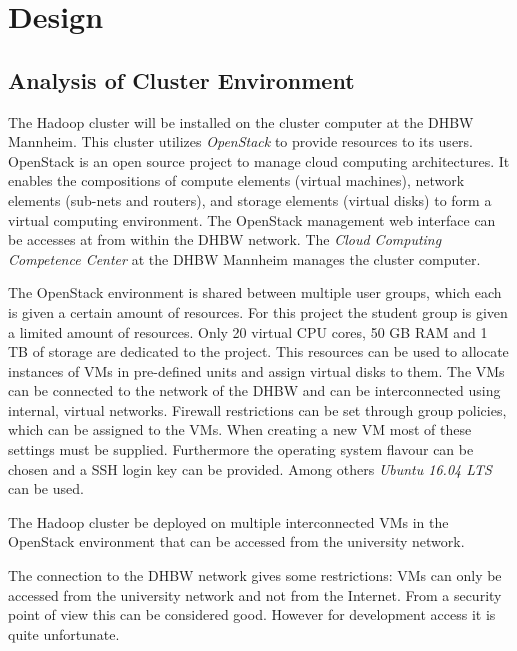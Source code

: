 \chapter{Design}
\label{chap:design}

\section{Analysis of Cluster Environment}

The Hadoop cluster will be installed on the cluster computer at the \ac{DHBW} Mannheim.
This cluster utilizes \emph{OpenStack}  to provide resources to its users. 
OpenStack is an open source project to manage cloud computing architectures.
It enables the compositions of compute elements (virtual machines), network elements (sub-nets and routers), 
and storage elements (virtual disks) to form a virtual computing environment.
The OpenStack management web interface can be accesses at  from within the \ac{DHBW} network. 
The \emph{Cloud Computing Competence Center} at the \ac{DHBW} Mannheim  manages the cluster computer.

The OpenStack environment is shared between multiple user groups, 
which each is given a certain amount of resources. 
For this project the student group is given a limited amount of resources.
Only 20 virtual \ac{CPU} cores, 50 \ac{GB} \ac{RAM} and 1 \ac{TB} of storage are dedicated to the project.
This resources can be used to allocate instances of \acp{VM} in pre-defined units and assign virtual disks to them.
The \acp{VM} can be connected to the network of the \ac{DHBW} and can be interconnected using internal, virtual networks.
Firewall restrictions can be set through group policies, which can be assigned to the \acp{VM}. 
When creating a new \ac{VM} most of these settings must be supplied. 
Furthermore the operating system flavour can be chosen and a \ac{SSH} login key can be provided.
Among others \emph{Ubuntu 16.04 LTS} can be used.

The Hadoop cluster be deployed on multiple interconnected \acp{VM} in the OpenStack environment that can be accessed from the university network.

The connection to the \ac{DHBW} network gives some restrictions: \acp{VM} can only be accessed from the university network and not from the Internet.
From a security point of view this can be considered good. However for development access it is quite unfortunate. 


